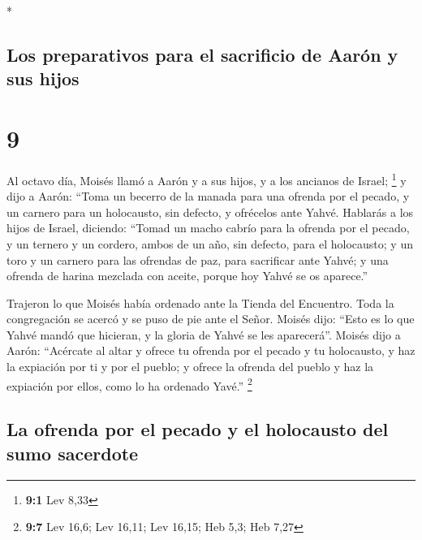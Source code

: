 \begin{paracol}{2}
\begin{otherlanguage}{english}
\end{otherlanguage}

\switchcolumn[0]*

\hypertarget{los-preparativos-para-el-sacrificio-de-aaruxf3n-y-sus-hijos}{%
\subsection{Los preparativos para el sacrificio de Aarón y sus
hijos}\label{los-preparativos-para-el-sacrificio-de-aaruxf3n-y-sus-hijos}}

\hypertarget{section-16}{%
\section{9}\label{section-16}}

 Al octavo día, Moisés llamó a Aarón y a sus hijos, y a
los ancianos de Israel; \footnote{\textbf{9:1} Lev 8,33} 
y dijo a Aarón: ``Toma un becerro de la manada para una ofrenda por el
pecado, y un carnero para un holocausto, sin defecto, y ofrécelos ante
Yahvé.  Hablarás a los hijos de Israel, diciendo: ``Tomad
un macho cabrío para la ofrenda por el pecado, y un ternero y un
cordero, ambos de un año, sin defecto, para el holocausto;
 y un toro y un carnero para las ofrendas de paz, para
sacrificar ante Yahvé; y una ofrenda de harina mezclada con aceite,
porque hoy Yahvé se os aparece.''

 Trajeron lo que Moisés había ordenado ante la Tienda del
Encuentro. Toda la congregación se acercó y se puso de pie ante el
Señor.  Moisés dijo: ``Esto es lo que Yahvé mandó que
hicieran, y la gloria de Yahvé se les aparecerá''.  Moisés
dijo a Aarón: ``Acércate al altar y ofrece tu ofrenda por el pecado y tu
holocausto, y haz la expiación por ti y por el pueblo; y ofrece la
ofrenda del pueblo y haz la expiación por ellos, como lo ha ordenado
Yavé.'' \footnote{\textbf{9:7} Lev 16,6; Lev 16,11; Lev 16,15; Heb 5,3;
  Heb 7,27}

\hypertarget{la-ofrenda-por-el-pecado-y-el-holocausto-del-sumo-sacerdote}{%
\subsection{La ofrenda por el pecado y el holocausto del sumo
sacerdote}\label{la-ofrenda-por-el-pecado-y-el-holocausto-del-sumo-sacerdote}}


\end{paracol}
